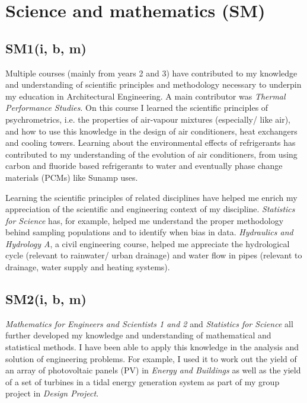 
\section{Science and mathematics (SM)}

\subsection*{SM1(i, b, m)}

Multiple courses (mainly from years 2 and 3) have contributed to my knowledge and understanding of scientific principles and methodology necessary to underpin my education in Architectural Engineering.
A main contributor was \textit{Thermal Performance Studies}.
On this course I learned the scientific principles of psychrometrics, i.e. the properties of air-vapour mixtures (especially/ like air), and how to use this knowledge in the design of air conditioners, heat exchangers and cooling towers.
Learning about the environmental effects of refrigerants has contributed to my understanding of the evolution of air conditioners, from using carbon and fluoride based refrigerants to water and eventually phase change materials (PCMs) like Sunamp uses.

Learning the scientific principles of related disciplines have helped me enrich my appreciation of the scientific and engineering context of my discipline.
\textit{Statistics for Science} has, for example, helped me understand the proper methodology behind sampling populations and to identify when bias in data.
\textit{Hydraulics and Hydrology A}, a civil engineering course, helped me appreciate the hydrological cycle (relevant to rainwater/ urban drainage) and water flow in pipes (relevant to drainage, water supply and heating systems).


\subsection*{SM2(i, b, m)}

\textit{Mathematics for Engineers and Scientists 1 and 2} and \textit{Statistics for Science} all further developed my knowledge and understanding of mathematical and statistical methods.
I have been able to apply this knowledge in the analysis and solution of engineering problems.
For example, I used it to work out the yield of an array of photovoltaic panels (PV) in \textit{Energy and Buildings} as well as the yield of a set of turbines in a tidal energy generation system as part of my group project in \textit{Design Project}.


